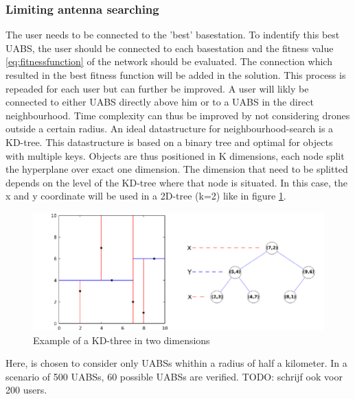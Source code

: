 \subsubsection{Limiting antenna searching}
The user needs to be connected to the 'best' basestation. To indentify this best \gls{UABS}, the user should be connected 
to each basestation and the fitness value \ref{eq:fitnessfunction} of the network should be evaluated. The connection which resulted in the best fitness function
will be added in the solution. This process is repeaded for each user but can further be improved. A user will likly be connected to either 
\gls{UABS} directly above him or to a \gls{UABS} in the direct neighbourhood. Time complexity can thus be improved by not considering drones 
outside a certain radius.
An ideal datastructure for neighbourhood-search is a KD-tree. This datastructure is based on a binary tree and optimal for objects with 
multiple keys. Objects are thus positioned in K dimensions, each node split the hyperplane over exact one dimension. The dimension that need 
to be splitted depends on the level of the KD-tree where that node is situated.
In this case, the x and y coordinate will be used in a 2D-tree (k=2) like in figure \ref{fig:exampleKDtree}.

\begin{figure}[H]
  \includegraphics[width=\textwidth]{../images/Example-of-a-2D-k-d-tree.png}
  \caption{Example of a KD-three in two dimensions}
  \label{fig:exampleKDtree}
\end{figure}


Here, is chosen to consider only \gls{UABS}s whithin a radius of half a kilometer. In a scenario of 500 \gls{UABS}s, 60 possible \gls{UABS}s are verified.
TODO: schrijf ook voor 200 users.
